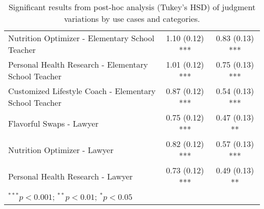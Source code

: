 \begin{table}[h]
\begin{center}
\begin{tabular}{lcc}
        Nutrition Optimizer - Elementary School Teacher & 1.10 (0.12) *** & 0.83 (0.13) *** \\
        Personal Health Research - Elementary School Teacher & 1.01 (0.12) *** & 0.75 (0.13) *** \\
        Customized Lifestyle Coach - Elementary School Teacher & 0.87 (0.12) *** & 0.54 (0.13) *** \\
        Flavorful Swaps - Lawyer & 0.75 (0.12) ***  & 0.47 (0.13) **  \\
        Nutrition Optimizer - Lawyer & 0.82 (0.12) *** & 0.57 (0.13) *** \\
        Personal Health Research - Lawyer & 0.73 (0.12) *** & 0.49 (0.13) **  \\
        \bottomrule
        \multicolumn{3}{l}{\scriptsize{$^{***}p<0.001$; $^{**}p<0.01$; $^{*}p<0.05$}}
    \end{tabular}
\end{center}
\caption{Significant results from post-hoc analysis (Tukey's HSD) of judgment variations by use cases and categories.}
\label{tab:use-case-effect-post-hoc-judgment}
\end{table}